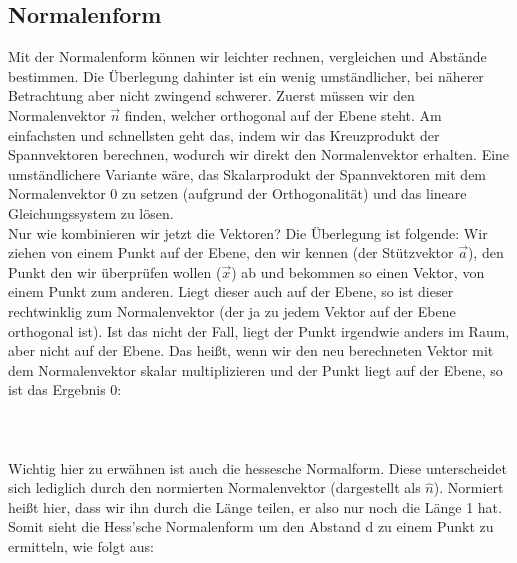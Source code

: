 	\subsection{Normalenform}
		Mit der Normalenform können wir leichter rechnen, vergleichen und Abstände
		bestimmen. Die Überlegung dahinter ist ein wenig umständlicher, bei näherer
		Betrachtung aber nicht zwingend schwerer. Zuerst müssen wir den Normalenvektor
		\(\vec{n}\) finden, welcher orthogonal auf der Ebene steht. Am einfachsten und
		schnellsten geht das, indem wir das Kreuzprodukt der Spannvektoren berechnen,
		wodurch wir direkt den Normalenvektor erhalten. Eine umständlichere Variante
		wäre, das Skalarprodukt der Spannvektoren mit dem Normalenvektor 0 zu setzen
		(aufgrund der Orthogonalität) und das lineare Gleichungssystem zu lösen.\\
		Nur wie kombinieren wir jetzt die Vektoren? Die Überlegung ist folgende: Wir
		ziehen von einem Punkt auf der Ebene, den wir kennen (der Stützvektor
		\(\vec{a}\)), den Punkt den wir überprüfen wollen (\(\vec{x}\)) ab und
		bekommen so einen Vektor, von einem Punkt zum anderen. Liegt dieser auch auf
		der Ebene, so ist dieser rechtwinklig zum Normalenvektor (der ja zu jedem
		Vektor auf der Ebene orthogonal ist). Ist das nicht der Fall, liegt der Punkt
		irgendwie anders im Raum, aber nicht auf der Ebene. Das heißt, wenn wir den
		neu berechneten Vektor mit dem Normalenvektor skalar multiplizieren und der
		Punkt liegt auf der Ebene, so ist das Ergebnis 0:
		\\ \\
		\formel{\[E:\ (\vec{a}-\vec{x})\cdot\vec{n}=0\]}
		\\ \\
		Wichtig hier zu erwähnen ist auch die hessesche Normalform. Diese
		unterscheidet sich lediglich durch den normierten Normalenvektor (dargestellt
		als \(\hat n\)). Normiert heißt hier, dass wir ihn durch die Länge teilen, er
		also nur noch die Länge 1 hat. Somit sieht die Hess'sche Normalenform um den
		Abstand d zu einem Punkt zu ermitteln, wie folgt aus:
		\\ \\
		\formel{\[E:\ (\vec{a}-\vec{x})\cdot
		\frac{1}{|\vec{n}|}\vec{n}=(\vec{a}-\vec{x})\cdot \hat{n}=d\]}

